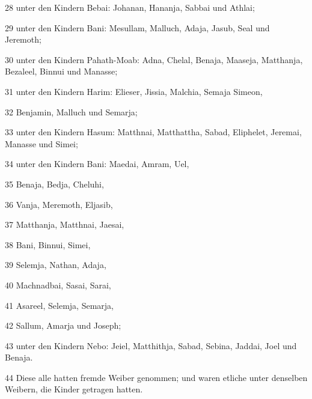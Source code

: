 \par 28 unter den Kindern Bebai: Johanan, Hananja, Sabbai und Athlai;
\par 29 unter den Kindern Bani: Mesullam, Malluch, Adaja, Jasub, Seal und Jeremoth;
\par 30 unter den Kindern Pahath-Moab: Adna, Chelal, Benaja, Maaseja, Matthanja, Bezaleel, Binnui und Manasse;
\par 31 unter den Kindern Harim: Elieser, Jissia, Malchia, Semaja Simeon,
\par 32 Benjamin, Malluch und Semarja;
\par 33 unter den Kindern Hasum: Matthnai, Matthattha, Sabad, Eliphelet, Jeremai, Manasse und Simei;
\par 34 unter den Kindern Bani: Maedai, Amram, Uel,
\par 35 Benaja, Bedja, Cheluhi,
\par 36 Vanja, Meremoth, Eljasib,
\par 37 Matthanja, Matthnai, Jaesai,
\par 38 Bani, Binnui, Simei,
\par 39 Selemja, Nathan, Adaja,
\par 40 Machnadbai, Sasai, Sarai,
\par 41 Asareel, Selemja, Semarja,
\par 42 Sallum, Amarja und Joseph;
\par 43 unter den Kindern Nebo: Jeiel, Matthithja, Sabad, Sebina, Jaddai, Joel und Benaja.
\par 44 Diese alle hatten fremde Weiber genommen; und waren etliche unter denselben Weibern, die Kinder getragen hatten.

